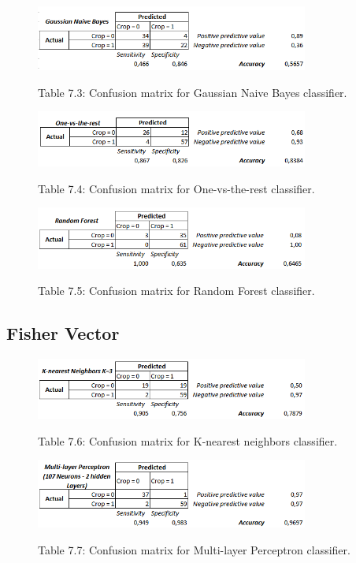 \documentclass[12pt]{article}
\numberwithin{equation}{section}
\numberwithin{table}{section}
\numberwithin{figure}{section}
\begin{document}
\begin{figure}[H] \centering
	\caption*{Table 7.3: Confusion matrix for Gaussian Naive Bayes classifier. }
	\includegraphics[width=0.8\textwidth]{m3.png}
	\label{m3}
\end{figure}

\begin{figure}[H] \centering
	\caption*{Table 7.4: Confusion matrix for One-vs-the-rest classifier. }
	\includegraphics[width=0.8\textwidth]{m4.png}
	\label{m4}
\end{figure}

\begin{figure}[H] \centering
	\caption*{Table 7.5: Confusion matrix for Random Forest classifier. }
	\includegraphics[width=0.8\textwidth]{m5.png}
	\label{m5}
\end{figure}

\subsection{Fisher Vector}

\begin{figure}[H] \centering
	\caption*{Table 7.6: Confusion matrix for K-nearest neighbors classifier. }
	\includegraphics[width=0.8\textwidth]{m6.png}
	\label{m6}
\end{figure}

\begin{figure}[H] \centering
	\caption*{Table 7.7: Confusion matrix for Multi-layer Perceptron classifier. }
	\includegraphics[width=0.8\textwidth]{m7.png}
	\label{m7}
\end{figure}
\end{document}
